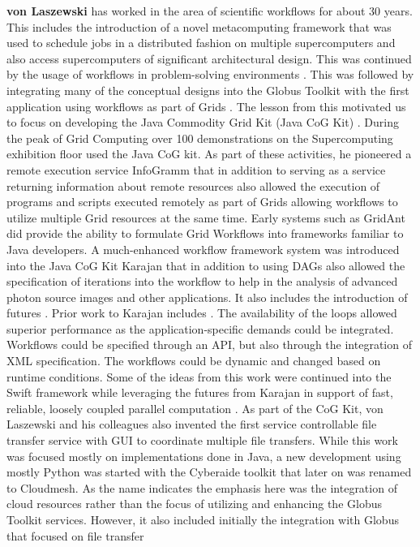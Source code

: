 \documentclass[utf8]{FrontiersinVancouver} %
\begin{document}
{\bf von Laszewski} has worked in the area of scientific workflows for about 30 years. This includes the introduction of a novel metacomputing framework \citep{las-99-loosely,las-94-ecwmf,las-96-ecwmf} that was used to schedule jobs in a distributed fashion on multiple supercomputers and also access supercomputers of significant architectural design. 
This was continued by the usage of workflows in problem-solving environments \citep{las-01-pse}. This was followed by integrating many of the conceptual designs into the Globus Toolkit with the first application using workflows as part of Grids \citep{las-00-sbc}. The lesson from this motivated us to focus on developing the Java Commodity Grid Kit (Java CoG Kit) \citep{las-06-workcoordination,
las-06-workflow-book,
las-06-exp-a,
las-05-workflowrepo,
las-05-workflow-jgc,
las-05-exp,
las-04-abstraction-j,
las-03-gridcomputing,
las-02-javacog,
las-00-grande,
las-01-cog-concurency}. 
During the peak of Grid Computing over 100 demonstrations on the Supercomputing exhibition floor used the Java CoG kit. As part of these activities, he pioneered a remote execution service InfoGramm 
\citep{las-02-infogram}
that in addition to serving as a service returning information about remote resources also allowed the execution of programs and scripts executed remotely as part of Grids allowing workflows to utilize multiple Grid resources at the same time. Early systems such as GridAnt \citep{las-04-gridant} 
did provide the ability to formulate Grid Workflows into frameworks familiar to Java developers. A much-enhanced workflow framework system was introduced into the  Java CoG Kit Karajan \citep{las-06-workflow-book} that in addition to using DAGs also allowed the specification of iterations into the workflow to help in the analysis of advanced photon source images and other applications. It also includes the introduction of futures \cite{friedman-futures}. Prior work to Karajan includes \citep{las-04-gridant,las-01-cog-concurency,las-96-ecwmf}. The availability of the loops allowed superior performance as the application-specific demands could be integrated. Workflows could be specified through an API, but also through the integration of XML specification. The workflows could be dynamic and changed based on runtime conditions. Some of the ideas from this work were continued into the Swift framework while leveraging the futures from Karajan in support of fast, reliable, loosely coupled parallel computation \citep{las--7-swift}. 
As part of the CoG Kit, von Laszewski and his colleagues also invented the first service controllable file transfer service with GUI to coordinate multiple file transfers. While this work was focused mostly on implementations done in Java, a new development using mostly Python was started with the Cyberaide toolkit \citep{las-09-ccgrid} that later on was renamed to Cloudmesh. As the name indicates the emphasis here was the integration of cloud resources rather than the focus of utilizing and enhancing the Globus Toolkit services. However, it also included initially the integration with Globus that focused on file transfer 
\end{document}

